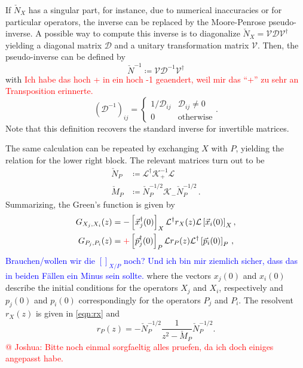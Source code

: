 \documentclass[
    reprint, 
    aps,
    preprintnumbers,
    twocolumn,
    prb,
    superscriptaddress
]{revtex4-2}
\newcommand{\bs}{\begin{subequations}}
\newcommand{\es}{\end{subequations}}
\newcommand{\red}[1]{\textcolor{red}{#1}}
\newcommand{\blue}[1]{\textcolor{blue}{#1}}
\begin{document}
If $\check{N}_X$ has a singular part, for instance, due to numerical inaccuracies or for particular operators, the inverse can be replaced by the Moore-Penrose pseudo-inverse. 
A possible way to compute this inverse is to diagonalize 
$\check{N}_X = \mathcal{V} \mathcal{D} \mathcal{V}^\dagger$ yielding a diagonal matrix $\mathcal{D}$ and a unitary transformation matrix $\mathcal{V}$. 
Then, the pseudo-inverse can be defined by
\begin{equation}
    \check{N}^{-1} \coloneqq \mathcal{V} \mathcal{D}^{-1} \mathcal{V}^\dagger
\end{equation}
with \red{Ich habe das hoch + in ein hoch -1 geaendert, weil mir das "`+"' zu sehr an Transposition erinnerte.}
\begin{equation}
    (\mathcal{D}^{-1})_{ij} = \begin{cases}
        1/\mathcal{D}_{ij} & \mathcal{D}_{ij} \neq 0 \\ 0 & \text{otherwise}
    \end{cases}.
\end{equation}
Note that this definition recovers the standard inverse for invertible matrices.

The same calculation can be repeated by exchanging $X$ with $P$, yielding the relation for the lower right block.
The relevant matrices turn out to be 
\bs
\begin{align}
    \check{N}_P &\coloneqq \mathcal{L}^\dagger \mathcal{K}_+^{-1} \mathcal{L}
		\\
		\check{M}_P &\coloneqq \check{N}_P^{-1/2} \mathcal{K}_- \check{N}_P^{-1/2}\,.
\end{align}
\es
Summarizing, the Green's function is given by
\begin{subequations}
    \begin{align}
        G_{X_j,X_i}  (z) &= - \left[ \vec{x}_j^\dagger (0) \right]_X \mathcal{L}^\dagger r_X (z) \mathcal{L} \left[ \vec{x}_i(0) \right]_X, 
				\\
        G_{P_j,P_i} (z) &= \red{+} \left[ \vec{p}_j^\dagger (0) \right]_P \mathcal{L} r_P (z) \mathcal{L}^\dagger \left[ \vec{p}_i(0) \right]_P\,,
    \end{align}
\end{subequations}
\blue{Brauchen/wollen wir die $[]_{X/P}$ noch? Und ich bin mir ziemlich sicher, dass das in beiden Fällen ein Minus sein sollte.}
where the vectors $x_j(0)$ and $x_i(0)$ describe the initial conditions for the operators
$X_j$ and $X_i$, respectively and $p_j(0)$ and $p_i(0)$ correspondingly for the operators
$P_j$ and $P_i$. The resolvent $r_X (z)$ is given in \eqref{eqn:rx} and 
\begin{equation}
    r_P (z) = -\check{N}_P^{-1/2} \frac{1}{z^2 - \check{M}_P} \check{N}_P^{-1/2} .
\end{equation}
\red{@ Joshua: Bitte noch einmal sorgfaeltig alles pruefen, da ich doch einiges angepasst habe.}
\end{document}
